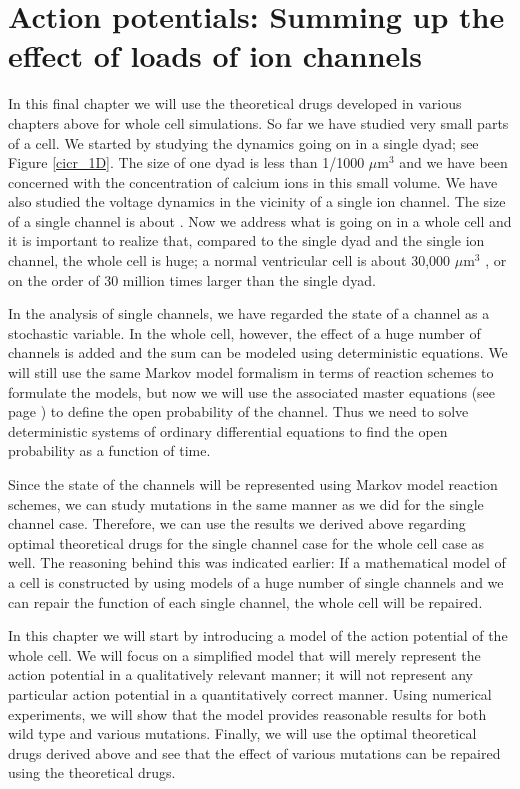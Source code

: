 \chapter[Whole cell action potentials]{Action potentials: Summing up the effect of loads of ion channels}
\label{ap}

    In this final chapter we will use the theoretical drugs developed in various chapters above for whole cell simulations. So far we have studied very small parts of a cell. We started by studying the dynamics going on in a single dyad; see Figure \ref{cicr_1D}. The size of one dyad is
less than 1/1000 $\mu \mbox{m}^3$\cite{Bers2001} and we have been concerned with the concentration of calcium ions in this small volume. We have also studied the voltage dynamics in the vicinity of a single ion channel. The size of a single channel is about . Now we address what is going on in a whole cell and it is important to realize that, compared to the single dyad and the single ion channel, the whole cell is huge; a normal ventricular cell is about 30,000 $\mu \mbox{m}^3$  \cite{Bers2001}, or on the order of  30 million times larger than the single dyad.

    In the analysis of single channels, we have regarded the state of a channel as a stochastic variable. In the whole cell, however, the effect of a huge number of channels is added and the sum can be modeled using deterministic equations. We will still use the same Markov model formalism in terms of reaction schemes to formulate the models, but now we will use the associated master equations (see page \pageref{master_equation}) to define the open probability of the channel. Thus we need to solve deterministic systems of ordinary differential equations to find the open probability as a function of time.

    Since the state of the channels will be represented using Markov model reaction schemes, we can study mutations in the same manner as we did for the single channel case. Therefore, we can use the results we derived above regarding optimal theoretical drugs for the single channel case for the whole cell case as well. The reasoning behind this was indicated earlier: If a mathematical model of a cell is constructed by using models of a huge number of single channels and we can repair the function of each single channel, the whole cell will be repaired.

    In this chapter we will start by introducing a model of the action potential of the whole cell. We will focus on a simplified model that will merely represent the action potential in a qualitatively relevant manner; it will not represent any particular action potential in a quantitatively correct manner.   Using numerical experiments, we will show that the model provides reasonable results for both wild type and various mutations. Finally, we will use the optimal theoretical drugs derived above and see that the effect of various mutations can be repaired using the theoretical drugs.

